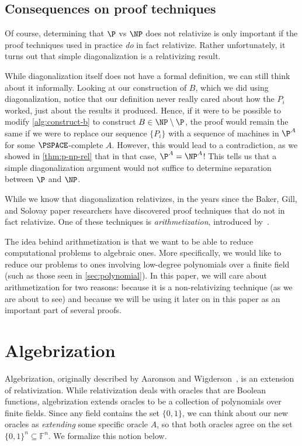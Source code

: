 \documentclass[english,12pt]{reedthesis}
\theoremstyle{plain}
\theoremstyle{definition}
\theoremstyle{remark}
\begin{document}
\section{Consequences on proof techniques}\label{sec:rel-conseq}

Of course, determining that $\P$ vs $\NP$ does not relativize is only important
if the proof techniques used in practice \emph{do} in fact relativize. Rather
unfortunately, it turns out that simple diagonalization is a relativizing
result.

While diagonalization itself does not have a formal definition, we can still
think about it informally. Looking at our construction of $B$, which we did
using diagonalization, notice that our definition never really cared about how
the $P_{i}$ worked, just about the results it produced. Hence, if it were to be
possible to modify \cref{alg:construct-b} to construct $B \in \NP \setminus \P$, the proof
would remain the same if we were to replace our sequence $\{P_{i}\}$ with a
sequence of machines in $\P^{A}$ for some $\PSPACE$-complete $A$. However, this
would lead to a contradiction, as we showed in \cref{thm:p-np-rel} that in that
case, $\P^{A} = \NP^{A}$! This tells us that a simple diagonalization argument
would not suffice to determine separation between $\P$ and $\NP$.

While we know that diagonalization relativizes, in the years since the Baker,
Gill, and Solovay paper researchers have discovered proof techniques that do not
in fact relativize. One of these techniques is
\emph{arithmetization}, introduced by~\cite{BF91}.

The idea behind arithmetization is that we want to be able to reduce
computational problems to algebraic ones. More specifically, we would like to
reduce our problems to ones involving low-degree polynomials over a finite field
(such as those seen in \cref{sec:polynomial}). In this paper, we will care about
arithmetization for two reasons: because it is a non-relativizing technique (as
we are about to see) and because we will be using it later on in this paper as
an important part of several proofs. %

\chapter{Algebrization}\label{chap:algebrization}

Algebrization, originally described by Aaronson and Wigderson~\cite{AW09}, is an
extension of relativization. While relativization deals with oracles that are
Boolean functions, algebrization extends oracles to be a collection of
polynomials over finite fields. Since any field contains the set $\{0, 1\}$, we
can think about our new oracles as \emph{extending} some specific oracle $A$, so
that both oracles agree on the set $\{0, 1\}^{n} \subseteq \mathbb{F}^{n}$. We formalize
this notion below.
\end{document}
